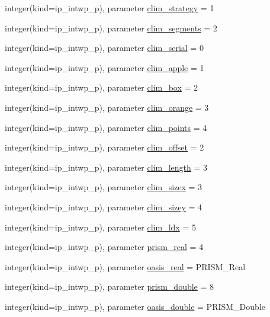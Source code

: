\begin{DoxyCompactItemize}
\item 
integer(kind=ip\+\_\+intwp\+\_\+p), parameter \hyperlink{namespacemod__oasis__parameters_a611cae6f3c65a75f26e76b2f88f34037}{clim\+\_\+strategy} = 1
\item 
integer(kind=ip\+\_\+intwp\+\_\+p), parameter \hyperlink{namespacemod__oasis__parameters_a7427036a6530871a0f49c0fb75f2b3ef}{clim\+\_\+segments} = 2
\item 
integer(kind=ip\+\_\+intwp\+\_\+p), parameter \hyperlink{namespacemod__oasis__parameters_a5c410369e763f9156d0ce1c82e866265}{clim\+\_\+serial} = 0
\item 
integer(kind=ip\+\_\+intwp\+\_\+p), parameter \hyperlink{namespacemod__oasis__parameters_a3cfd98fdd1c2fac653b182454c87f4aa}{clim\+\_\+apple} = 1
\item 
integer(kind=ip\+\_\+intwp\+\_\+p), parameter \hyperlink{namespacemod__oasis__parameters_a9a8b38629274e3a38a37f329ce9d2aa2}{clim\+\_\+box} = 2
\item 
integer(kind=ip\+\_\+intwp\+\_\+p), parameter \hyperlink{namespacemod__oasis__parameters_a17c74cc8141b595e448588b1add0f6bf}{clim\+\_\+orange} = 3
\item 
integer(kind=ip\+\_\+intwp\+\_\+p), parameter \hyperlink{namespacemod__oasis__parameters_aa9d90a3d7d5b21d2081a578dfea42fd4}{clim\+\_\+points} = 4
\item 
integer(kind=ip\+\_\+intwp\+\_\+p), parameter \hyperlink{namespacemod__oasis__parameters_a4cd07733eaf5d8c8148986c0c4217772}{clim\+\_\+offset} = 2
\item 
integer(kind=ip\+\_\+intwp\+\_\+p), parameter \hyperlink{namespacemod__oasis__parameters_a984896e821cbbb8c4a91e86ff19d54de}{clim\+\_\+length} = 3
\item 
integer(kind=ip\+\_\+intwp\+\_\+p), parameter \hyperlink{namespacemod__oasis__parameters_a4fb35a666ab4cec927a2ae9244535cb0}{clim\+\_\+sizex} = 3
\item 
integer(kind=ip\+\_\+intwp\+\_\+p), parameter \hyperlink{namespacemod__oasis__parameters_a206910560c246db3404224a04cfd4319}{clim\+\_\+sizey} = 4
\item 
integer(kind=ip\+\_\+intwp\+\_\+p), parameter \hyperlink{namespacemod__oasis__parameters_a3407c11054d24782182c649307808e47}{clim\+\_\+ldx} = 5
\item 
integer(kind=ip\+\_\+intwp\+\_\+p), parameter \hyperlink{namespacemod__oasis__parameters_a02e0627219e7769df37e3d55da46f65d}{prism\+\_\+real} = 4
\item 
integer(kind=ip\+\_\+intwp\+\_\+p), parameter \hyperlink{namespacemod__oasis__parameters_ae7760fcfae19d2f3cbf759688cd35193}{oasis\+\_\+real} = P\+R\+I\+S\+M\+\_\+\+Real
\item 
integer(kind=ip\+\_\+intwp\+\_\+p), parameter \hyperlink{namespacemod__oasis__parameters_a9527d2d640ea7d747143bf994ee9b206}{prism\+\_\+double} = 8
\item 
integer(kind=ip\+\_\+intwp\+\_\+p), parameter \hyperlink{namespacemod__oasis__parameters_a1071adbbf4c378907b4ff69dd53d0d7e}{oasis\+\_\+double} = P\+R\+I\+S\+M\+\_\+\+Double
\end{DoxyCompactItemize}


